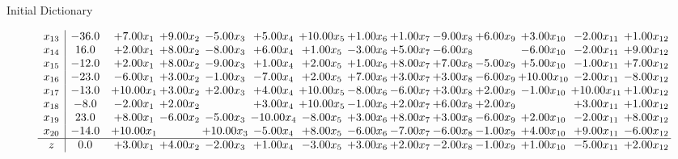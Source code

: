 \documentclass[8pt]{article}
\begin{document}
Initial Dictionary 

\[\begin{array}{c| c c@{\hskip 2pt} c@{\hskip 2pt} c@{\hskip 2pt} c@{\hskip 2pt} c@{\hskip 2pt} c@{\hskip 2pt} c@{\hskip 2pt} c@{\hskip 2pt} c@{\hskip 2pt} c@{\hskip 2pt} c@{\hskip 2pt} c@{\hskip 2pt} }
 x_{13}   &  -36.0 & +  7.00 x_{1} & +  9.00 x_{2} & -5.00 x_{3} & +  5.00 x_{4} & + 10.00 x_{5} & +  1.00 x_{6} & +  1.00 x_{7} & -9.00 x_{8} & +  6.00 x_{9} & +  3.00 x_{10} & -2.00 x_{11} & +  1.00 x_{12}\\
 x_{14}   &  16.0 & +  2.00 x_{1} & +  8.00 x_{2} & -8.00 x_{3} & +  6.00 x_{4} & +  1.00 x_{5} & -3.00 x_{6} & +  5.00 x_{7} & -6.00 x_{8} &   & -6.00 x_{10} & -2.00 x_{11} & +  9.00 x_{12}\\
 x_{15}   &  -12.0 & +  2.00 x_{1} & +  8.00 x_{2} & -9.00 x_{3} & +  1.00 x_{4} & +  2.00 x_{5} & +  1.00 x_{6} & +  8.00 x_{7} & +  7.00 x_{8} & -5.00 x_{9} & +  5.00 x_{10} & -1.00 x_{11} & +  7.00 x_{12}\\
 x_{16}   &  -23.0 & -6.00 x_{1} & +  3.00 x_{2} & -1.00 x_{3} & -7.00 x_{4} & +  2.00 x_{5} & +  7.00 x_{6} & +  3.00 x_{7} & +  3.00 x_{8} & -6.00 x_{9} & + 10.00 x_{10} & -2.00 x_{11} & -8.00 x_{12}\\
 x_{17}   &  -13.0 & + 10.00 x_{1} & +  3.00 x_{2} & +  2.00 x_{3} & +  4.00 x_{4} & + 10.00 x_{5} & -8.00 x_{6} & -6.00 x_{7} & +  3.00 x_{8} & +  2.00 x_{9} & -1.00 x_{10} & + 10.00 x_{11} & +  1.00 x_{12}\\
 x_{18}   &  -8.0 & -2.00 x_{1} & +  2.00 x_{2} &   & +  3.00 x_{4} & + 10.00 x_{5} & -1.00 x_{6} & +  2.00 x_{7} & +  6.00 x_{8} & +  2.00 x_{9} &   & +  3.00 x_{11} & +  1.00 x_{12}\\
 x_{19}   &  23.0 & +  8.00 x_{1} & -6.00 x_{2} & -5.00 x_{3} & -10.00 x_{4} & -8.00 x_{5} & +  3.00 x_{6} & +  8.00 x_{7} & +  3.00 x_{8} & -6.00 x_{9} & +  2.00 x_{10} & -2.00 x_{11} & +  8.00 x_{12}\\
 x_{20}   &  -14.0 & + 10.00 x_{1} &   & + 10.00 x_{3} & -5.00 x_{4} & +  8.00 x_{5} & -6.00 x_{6} & -7.00 x_{7} & -6.00 x_{8} & -1.00 x_{9} & +  4.00 x_{10} & +  9.00 x_{11} & -6.00 x_{12}\\
\hline
z    &  0.0 & +  3.00 x_{1} & +  4.00 x_{2} & -2.00 x_{3} & +  1.00 x_{4} & -3.00 x_{5} & +  3.00 x_{6} & +  2.00 x_{7} & -2.00 x_{8} & -1.00 x_{9} & +  1.00 x_{10} & -5.00 x_{11} & +  2.00 x_{12}\\
\end{array}\]
\end{document}
